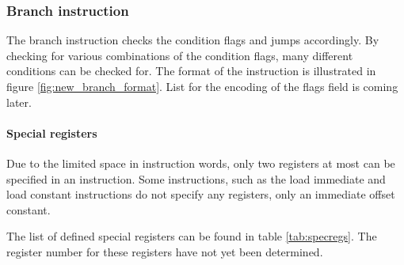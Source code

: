 \subsubsection{Branch instruction}
The branch instruction checks the condition flags and jumps accordingly. By
checking for various combinations of the condition flags, many different
conditions can be checked for. The format of the instruction is illustrated
in figure \ref{fig:new_branch_format}. List for the encoding of the flags field
is coming later.



\paragraph{Special registers}

Due to the limited space in instruction words, only two registers at most can be
specified in an instruction. Some instructions, such as the load immediate and
load constant instructions do not specify any registers, only an immediate
offset constant.

The list of defined special registers can be found in table \ref{tab:specregs}.
The register number for these registers have not yet been determined.


